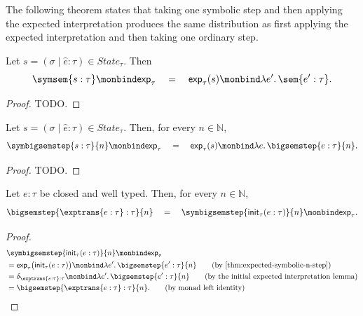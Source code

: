 The following theorem states that taking one symbolic step and then applying the expected interpretation produces the same distribution as first applying the expected interpretation and then taking one ordinary step.

\begin{theorem}
  \label{thm:expected-symbolic-step}
  Let $s=(\sigma \mid \hat e : \tau) \in State_\tau$.
  Then
  \[
    \symsem{s : \tau}
    \monbind
    \mathsf{exp}_\tau
    \quad 
    = 
    \quad
    \mathsf{exp}_\tau(s)
    \monbind
    \lambda e'.\,\sem{e' : \tau}.
  \]
\end{theorem}

\begin{proof}
  TODO.
\end{proof}

\begin{theorem}
  \label{thm:expected-symbolic-n-step}
  Let
  $s=(\sigma\mid\hat e:\tau)\in State_\tau$.
  Then, for every $n\in\mathbb N$,
  \[
    \symbigsemstep{s:\tau}{n}
    \monbind
    \mathsf{exp}_\tau
    \quad 
    = 
    \quad
    \mathsf{exp}_\tau(s)
    \monbind
    \lambda e.\,
    \bigsemstep{e:\tau}{n}.
  \]
\end{theorem}

\begin{proof}
  TODO.
\end{proof}


\begin{theorem}
  Let $e:\tau$ be closed and well typed. Then, for every
  $n\in\mathbb N$,
  \[
    \bigsemstep{\exptrans{e:\tau} : \tau}{n}
    \quad 
    = 
    \quad
    \symbigsemstep{\mathsf{init}_\tau(e:\tau)}{n}
    \monbind
    \mathsf{exp}_\tau.
  \]
\end{theorem}

\begin{proof}
  \begin{align}
    &\symbigsemstep{\mathsf{init}_\tau(e:\tau)}{n}
    \monbind
    \mathsf{exp}_\tau
    \notag
    \\
    &=
    \mathsf{exp}_\tau\bigl(\mathsf{init}_\tau(e:\tau)\bigr)
    \monbind
    \lambda e'.\,\bigsemstep{e':\tau}{n}
    \tag{\text{by \Cref{thm:expected-symbolic-n-step}}}
    \\
    &=
    \delta_{\exptrans{e:\tau}:\tau}
    \monbind
    \lambda e'.\,\bigsemstep{e':\tau}{n}
    \tag{\text{by the initial expected interpretation lemma}}
    \\
    &=
    \bigsemstep{\exptrans{e:\tau}:\tau}{n}.
    \tag{\text{by monad left identity}}
  \end{align}
\end{proof}



